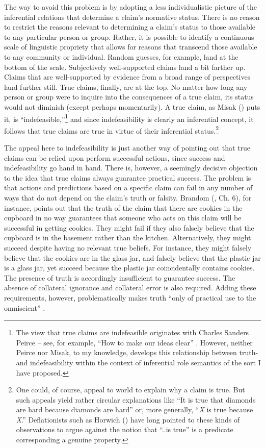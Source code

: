The way to avoid this problem is by adopting a less individualistic picture of the inferential relations that determine a claim's normative status. There is no reason to restrict the reasons relevant to determining a claim's status to those available to any particular person or group. Rather, it is possible to identify a continuous scale of linguistic propriety that allows for reasons that transcend those available to any community or individual. Random guesses, for example, land at the bottom of the scale. Subjectively well-supported claims land a bit farther up. Claims that are well-supported by evidence from a broad range of perspectives land further still. True claims, finally, are at the top. No matter how long any person or group were to inquire into the consequences of a true claim, its status would not diminish (except perhaps momentarily). A true claim, as Misak (\citeyear{Misak:2013}) puts it, is ``indefeasible,''\footnote{The view that true claims are indefeasible originates with Charles Sanders Peirce -- see, for example, ``How to make our ideas clear'' \citep{Peirce:1992}. However, neither Peirce nor Misak, to my knowledge, develops this relationship between truth- and indefeasibility within the context of inferential role semantics of the sort I have proposed.} and since indefeasibility is clearly an inferential concept, it follows that true claims are true in virtue of their inferential status.\footnote{One could, of course, appeal to world to explain why a claim is true. But such appeals yield rather circular explanations like ``It is true that diamonds are hard because diamonds are hard'' or, more generally, ``\textit{X} is true because \textit{X}.'' Deflationists such as Horwich (\citeyear{Horwich:2005}) have long pointed to these kinds of observations to argue against the notion that ``..is true'' is a predicate corresponding a genuine property.}

The appeal here to indefeasibility is just another way of pointing out that true claims can be relied upon perform successful actions, since success and indefeasibility go hand in hand. There is, however, a seemingly decisive objection to the idea that true claims always guarantee practical success. The problem is that actions and predictions based on a specific claim can fail in any number of ways that do not depend on the claim's truth or falsity. Brandom (\citeyear{Brandom:1994b,Brandom:2009}, Ch. 6), for instance, points out that the truth of the claim that there are cookies in the cupboard in no way guarantees that someone who acts on this claim will be successful in getting cookies. They might fail if they also falsely believe that the cupboard is in the basement rather than the kitchen. Alternatively, they might succeed despite having no relevant true beliefs. For instance, they might falsely believe that the cookies are in the glass jar, and falsely believe that the plastic jar is a glass jar, yet succeed because the plastic jar coincidentally contains cookies. The presence of truth is accordingly insufficient to guarantee success. The absence of collateral ignorance and collateral error is also required. Adding these requirements, however, problematically makes truth ``only of practical use to the omniscient'' \citep[][p. 161]{Brandom:2009}. 

